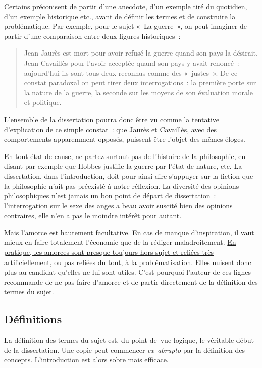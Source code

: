 \documentclass[a4paper,12pt]{article}
\begin{document}
Certains préconisent de partir d'une anecdote, d'un exemple tiré du
quotidien, d'un exemple historique etc., avant de définir les termes et
de construire la problématique. Par exemple, pour le sujet « La
guerre », on peut imaginer de partir d'une comparaison entre deux
figures historiques :
\begin{quote}
Jean Jaurès est mort pour avoir refusé la guerre quand son pays la
désirait, Jean Cavaillès pour l'avoir acceptée quand son pays y avait
renoncé : aujourd'hui ils sont tous deux reconnus comme des « justes ».
De ce constat paradoxal on peut tirer deux interrogations : la
première porte sur la nature de la guerre, la seconde sur les moyens
de son évaluation morale et politique.
\end{quote}
L'ensemble de la dissertation pourra donc être vu comme la tentative
d'explication de ce simple constat : que Jaurès et Cavaillès, avec des
comportements apparemment opposés, puissent être l'objet des mêmes
éloges.

En tout état de cause, \uline{ne partez surtout pas de l'histoire de la
philosophie}, en disant par exemple que Hobbes justifie la guerre par
l'état de nature, etc. La dissertation, dans l'introduction, doit pour
ainsi dire s'appuyer sur la fiction que la philosophie n'ait pas
préexisté à notre réflexion. La diversité des opinions philosophiques
n'est jamais un bon point de départ de dissertation : l'interrogation
sur le sexe des anges a beau avoir suscité bien des opinions contraires,
elle n'en a pas le moindre intérêt pour autant.

Mais l'amorce est hautement facultative. En cas de manque d'inspiration,
il vaut mieux en faire totalement l'économie que de la rédiger
maladroitement. \uline{En pratique, les amorces sont presque toujours hors
sujet et reliées très artificiellement, ou pas reliées du tout, à la
problématisation}. Elles nuisent donc plus au candidat qu'elles ne lui
sont utiles. C'est pourquoi l'auteur de ces lignes recommande de ne pas
faire d'amorce et de partir directement de la définition des termes du
sujet.


\subsection{Définitions}
\label{sec:orgefd02e7}
\label{org610e224}

La définition des termes du sujet est, du point de vue logique, le
véritable début de la dissertation. Une copie peut commencer
\emph{ex abrupto} par la définition des concepts. L'introduction est alors
sobre mais efficace.
\end{document}
